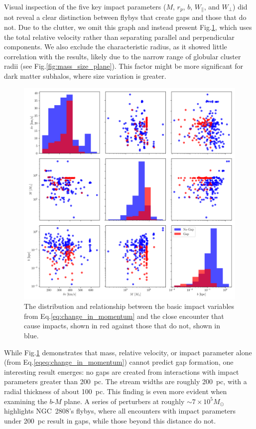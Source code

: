 \documentclass[draft]{aa}
\begin{document}
\begin{appendix}
      Visual inspection of the five key impact parameters ($M$, $r_p$, $b$, $W_\parallel$, and $W_\perp$) did not reveal a clear distinction between flybys that create gaps and those that do not. Due to the clutter, we omit this graph and instead present Fig.\ref{fig:impact_geometry_statistics}, which uses the total relative velocity rather than separating parallel and perpendicular components. We also exclude the characteristic radius, as it showed little correlation with the results, likely due to the narrow range of globular cluster radii (see Fig.\ref{fig:mass_size_plane}). This factor might be more significant for dark matter subhalos, where size variation is greater.
      
      
      \begin{figure}
        \centering
        \includegraphics[width=\linewidth]{impact_geometry_statistics.png}
        \caption{The distribution and relationship between the basic impact variables from Eq.\ref{eq:change_in_momentum} and the close encounter that cause impacts, shown in red against those that do not, shown in blue. }
        \label{fig:impact_geometry_statistics}    
        \end{figure}

      While Fig.\ref{fig:impact_geometry_statistics} demonstrates that mass, relative velocity, or impact parameter alone (from Eq.\ref{eqeq:change_in_momentum}) cannot predict gap formation, one interesting result emerges: no gaps are created from interactions with impact parameters greater than 200~pc. The stream widths are roughly 200~pc, with a radial thickness of about 100~pc. This finding is even more evident when examining the $b$-$M$ plane. A series of perturbers at roughly $\sim7 \times 10^5 M_\odot$ highlights NGC~2808's flybys, where all encounters with impact parameters under 200~pc result in gaps, while those beyond this distance do not.
        

\end{appendix}
\end{document}
